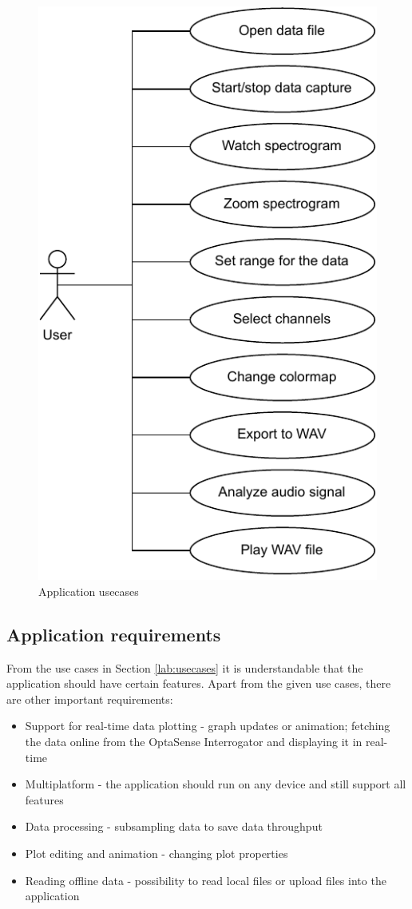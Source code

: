 \begin{figure}[h]
    \centering
    \includegraphics{pdf/usecase.drawio.pdf}
    \caption{Application usecases}
    \label{fig:usecase}
\end{figure}

\subsection{Application requirements}

From the use cases in Section \ref{lab:usecases} it is understandable that the application should have certain features. Apart from the given use cases, there are other important requirements:

\begin{itemize}
    \item Support for real-time data plotting - graph updates or animation; fetching the data online from the OptaSense Interrogator and displaying it in real-time
    \item Multiplatform - the application should run on any device and still support all features
    \item Data processing - subsampling data to save data throughput
    \item Plot editing and animation - changing plot properties
    \item Reading offline data - possibility to read local files or upload files into the application
\end{itemize}

